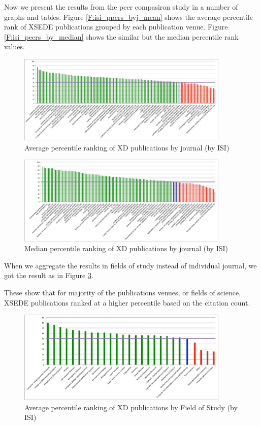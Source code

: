 \documentclass{sig-alternate}
\begin{document}
Now we present the results from the peer compasiron study in a number of graphs
and tables. Figure \ref{F:isi_ppers_byj_mean} shows the average percentile rank
of XSEDE publications grouped by each publication venue. Figure \ref{F:isi_peers_by_median}
shows the similar but the median percentile rank values.

\begin{figure}[htb!]
  \centering
    \includegraphics[width=0.9\textwidth]{images/isi_peers_byj_mean.pdf}
    \caption{Average percentile ranking of XD publications by journal (by ISI)}
    \label{F:isi_peers_byj_mean}
\end{figure}

\begin{figure}[htb!]
  \centering
    \includegraphics[width=0.9\textwidth]{images/isi_peers_byj_median.pdf}
    \caption{Median percentile ranking of XD publications by journal (by ISI)}
    \label{F:isi_peers_byj_median}
\end{figure}

When we aggregate the results in fields of study instead of individual journal, we got
the result as in Figure \ref{F:isi_peers_fos}.

These show that for majority of the publications venues, or fields of science, XSEDE publications
ranked at a higher percentile based on the citation count.

\begin{figure}[htb!]
  \centering
    \includegraphics[width=0.9\textwidth]{images/isi_peers_fos.pdf}
    \caption{Average percentile ranking of XD publications by Field of Study (by ISI)}
    \label{F:isi_peers_fos}
\end{figure}
\end{document}
